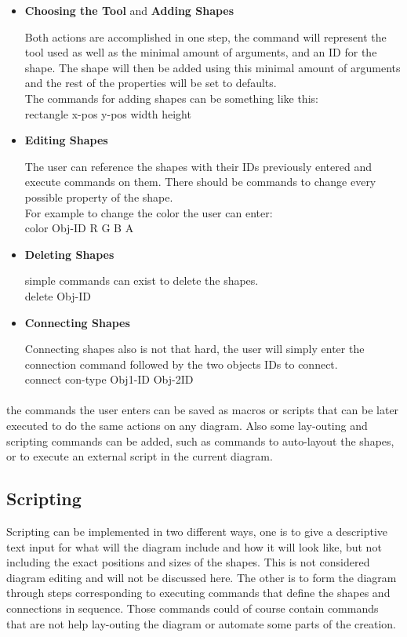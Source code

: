 \begin{itemize}
\item {{\bf Choosing the Tool} and {\bf Adding Shapes}}
\par \noindent
Both actions are accomplished in one step, the command will represent the tool used as well as the minimal amount of arguments, and an ID for the shape. The shape will then be added using this minimal amount of arguments and the rest of the properties will be set to defaults.\\
The commands for adding shapes can be something like this:\\
rectangle x-pos y-pos width height

\item {\bf Editing Shapes}
\par \noindent
The user can reference the shapes with their IDs previously entered and execute commands on them. There should be commands to change every possible property of the shape.\\
For example to change the color the user can enter:\\
color Obj-ID R G B A

\item {\bf Deleting Shapes}
\par \noindent
simple commands can exist to delete the shapes.\\
delete Obj-ID

\item {\bf Connecting Shapes}
\par \noindent
Connecting shapes also is not that hard, the user will simply enter the connection command followed by the two objects IDs to connect.\\
connect con-type Obj1-ID Obj-2ID

\end{itemize}

\paragraph{}
the commands the user enters can be saved as macros or scripts that can be later executed to do the same actions on any diagram. Also some lay-outing and scripting commands can be added, such as commands to auto-layout the shapes, or to execute an external script in the current diagram.

\subsection{Scripting}
Scripting can be implemented in two different ways, one is to give a descriptive text input for what will the diagram include and how it will look like, but not including the exact positions and sizes of the shapes. This is not considered diagram editing and will not be discussed here. The other is to form the diagram through steps corresponding to executing commands that define the shapes and connections in sequence. Those commands could of course contain commands that are not help lay-outing the diagram or automate some parts of the creation.










